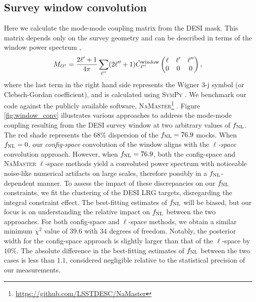 \subsection{Survey window convolution}\label{ssec:windowconv}
Here we calculate the mode-mode coupling matrix from the DESI mask. This matrix depends only on the survey geometry and can be described in terms of the window power spectrum \citep{hivon2002master},
\begin{equation}
M_{\ell \ell^{\prime}} = \frac{2\ell^{\prime}+1}{4\pi} \sum_{\ell^{\prime\prime}} (2\ell^{\prime\prime}+1) \tilde{C}^{\rm window}_{\ell^{\prime\prime}} \begin{pmatrix}
\ell & \ell^{\prime} & \ell^{\prime\prime}\\
0 & 0 & 0
\end{pmatrix},
\end{equation}
where the last term in the right hand side represents the Wigner 3-j symbol (or Clebsch-Gordan coefficient), and is calculated using \textsc{SymPy} \citep{sympy2017}. We benchmark our code against the publicly available software, \textsc{NaMaster}\footnote{\href{https://github.com/LSSTDESC/NaMaster}{https://github.com/LSSTDESC/NaMaster}} \citep{2019MNRAS.484.4127A}. Figure \ref{fig:window_conv} illustrates various approaches to address the mode-mode coupling resulting from the DESI survey window at two arbitrary values of $f_{\rm NL}$. The red shade represents the 68\% dispersion of the $f_{\rm NL}=76.9$ mocks. When $f_{\rm NL}=0$, our \textit{config-space} convolution of the window aligns with the \textit{$\ell$-space} convolution approach. However, when $f_{\rm NL}=76.9$, both the config-space and \textsc{NaMaster} $\ell$-space methods yield a convoluted power spectrum with noticeable noise-like numerical artifacts on large scales, therefore possibly in a $f_{\rm NL}$-dependent manner. To assess the impact of these discrepancies on our $f_{\rm NL}$ constraints, we fit the clustering of the DESI LRG targets, disregarding the integral constraint effect. The best-fitting estimates of $f_{\rm NL}$ will be biased, but our focus is on understanding the relative impact on $f_{\rm NL}$ between the two approaches. For both config-space and $\ell$-space methods, we obtain a similar minimum $\chi^{2}$ value of $39.6$ with $34$ degrees of freedom. Notably, the posterior width for the config-space approach is slightly larger than that of the $\ell$-space by $10\%$. The absolute difference in the best-fitting estimates of $f_{\rm NL}$ between the two cases is less than $1.1$, considered negligible relative to the statistical precision of our measurements.


